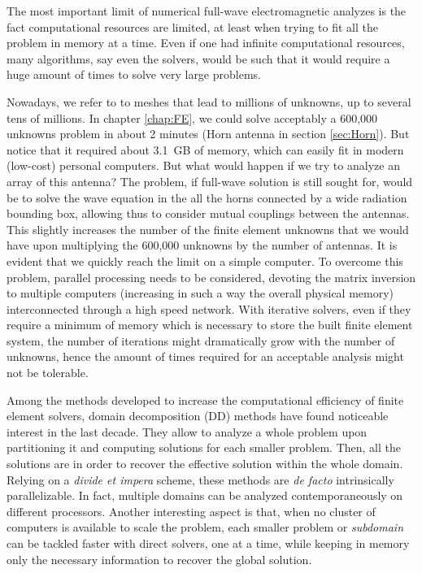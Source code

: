 The most important limit of numerical full-wave electromagnetic analyzes is the fact computational resources are limited, at least when trying to fit all the problem in memory at a time. Even if one had infinite computational resources, many algorithms, say even the solvers, would be such that it would require a huge amount of times to solve very large problems. 

Nowadays, we refer to  to meshes that lead to millions of unknowns, up to several tens of millions. In chapter \ref{chap:FE}, we could solve acceptably a 600,000 unknowns problem in about 2 minutes (Horn antenna in section \ref{sec:Horn}). But notice that it required about 3.1~GB of memory, which can easily fit in modern (low-cost) personal computers. But what would happen if we try to analyze an array of this antenna? The problem, if full-wave solution is still sought for, would be to solve the wave equation in the all the horns connected by a wide radiation bounding box, allowing thus to consider mutual couplings between the antennas. This slightly increases the number of the finite element unknowns that we would have upon multiplying the 600,000 unknowns by the number of antennas. It is evident that we quickly reach the limit on a simple computer. To overcome this problem, parallel processing needs to be considered, devoting the matrix inversion to multiple computers (increasing in such a way the overall physical memory) interconnected through a high speed network. With iterative solvers, even if they require a minimum of memory which is necessary to store the built finite element system, the number of iterations might dramatically grow with the number of unknowns, hence the amount of times required for an acceptable analysis might not be tolerable.

Among the methods developed to increase the computational efficiency of finite element solvers, domain decomposition (DD) methods have found noticeable interest in the last decade.  They allow to analyze a whole problem upon partitioning it and computing solutions for each smaller problem. Then, all the solutions are  in order to recover the effective solution within the whole domain. Relying on a \textit{divide et impera} scheme, these methods are \textit{de facto} intrinsically parallelizable. In fact, multiple domains can be analyzed contemporaneously on different processors. Another interesting aspect is that, when no cluster of computers is available to scale the problem, each smaller problem or \textit{subdomain} can be tackled faster with direct solvers, one at a time, while keeping in memory only the necessary information to recover the global solution. 

